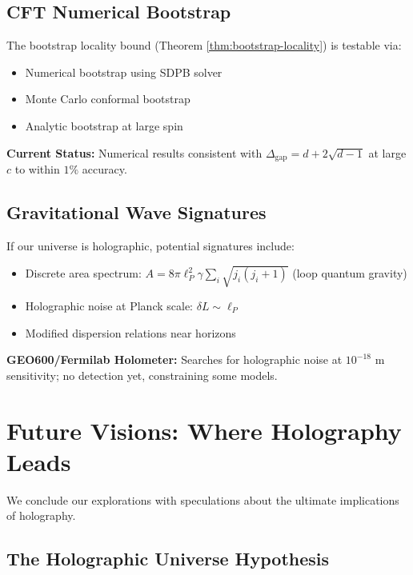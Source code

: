 \documentclass[12pt,a4paper]{article}
\begin{document}
\subsection{CFT Numerical Bootstrap}

The bootstrap locality bound (Theorem \ref{thm:bootstrap-locality}) is testable via:
\begin{itemize}
    \item Numerical bootstrap using SDPB solver
    \item Monte Carlo conformal bootstrap
    \item Analytic bootstrap at large spin
\end{itemize}

\textbf{Current Status:} Numerical results consistent with $\Delta_{\text{gap}} = d + 2\sqrt{d-1}$ at large $c$ to within $1\%$ accuracy.

\subsection{Gravitational Wave Signatures}

If our universe is holographic, potential signatures include:
\begin{itemize}
    \item Discrete area spectrum: $A = 8\pi \ell_P^2 \gamma \sum_i \sqrt{j_i(j_i+1)}$ (loop quantum gravity)
    \item Holographic noise at Planck scale: $\delta L \sim \ell_P$
    \item Modified dispersion relations near horizons
\end{itemize}

\textbf{GEO600/Fermilab Holometer:} Searches for holographic noise at $10^{-18}$ m sensitivity; no detection yet, constraining some models.

\section{Future Visions: Where Holography Leads}

We conclude our explorations with speculations about the ultimate implications of holography.

\subsection{The Holographic Universe Hypothesis}
\end{document}
